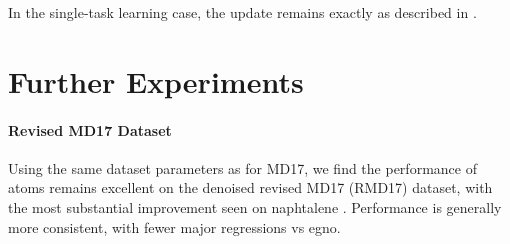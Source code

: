 In the single-task learning case, the update remains exactly as described in .

\section{Further Experiments}
\paragraph{Revised MD17 Dataset}
Using the same dataset parameters as for MD17, we find the performance of \gls{atoms} remains excellent on the denoised revised MD17 (RMD17) dataset, with the most substantial improvement seen on naphtalene \cite{christensen_revised_2020}. Performance is generally more consistent, with fewer major regressions vs \gls{egno}.

